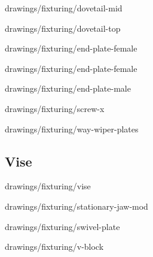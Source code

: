 
            {drawings/fixturing/dovetail-mid}


            {drawings/fixturing/dovetail-top}


            {drawings/fixturing/end-plate-female}


            {drawings/fixturing/end-plate-female}


            {drawings/fixturing/end-plate-male}


            {drawings/fixturing/screw-x}


            {drawings/fixturing/way-wiper-plates}

\subsection{Vise}


            {drawings/fixturing/vise}


            {drawings/fixturing/stationary-jaw-mod}


            {drawings/fixturing/swivel-plate}


            {drawings/fixturing/v-block}

